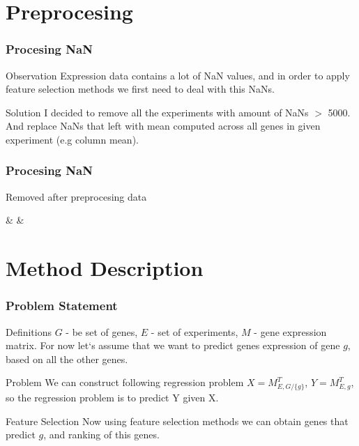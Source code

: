 \documentclass{beamer}
\begin{document}
\section{Preprocesing}
\begin{frame}
\frametitle{Procesing NaN}
\begin{block}{Observation}
Expression data contains a lot of NaN values, and in order to apply feature selection methods we first need to deal with this NaNs.
\end{block}
\begin{block}{Solution}
I decided to remove all the experiments with amount of NaNs $>$ 5000. And replace NaNs that left with mean computed across all genes in given experiment (e.g column mean).
\end{block}
\end{frame}


\begin{frame}
\frametitle{Procesing NaN}
\begin{table}
\centering
\label{table:preprocesing}
\caption{Removed after preprocesing data}
%
{\re & \rg & \mr}%
\end{table}

\end{frame}

\section{Method Description}
\begin{frame}
\frametitle{Problem Statement}
\begin{block}{Definitions}
$G$ - be set of genes, $E$ - set of experiments, $M$ - gene expression matrix. For now let`s assume that we want to predict genes expression of gene $g$, based on all the other genes.
\end{block}
\begin{block}{Problem}
We can construct following regression problem $X = M_{E, G/{\{g\}}}^T$, $Y = M_{E, g}^T$, so the regression problem is to predict Y given X.
\end{block}
\begin{block}{Feature Selection}
Now using feature selection methods we can obtain genes that predict $g$, and ranking of this genes.
\end{block}
\end{frame}
\end{document}

